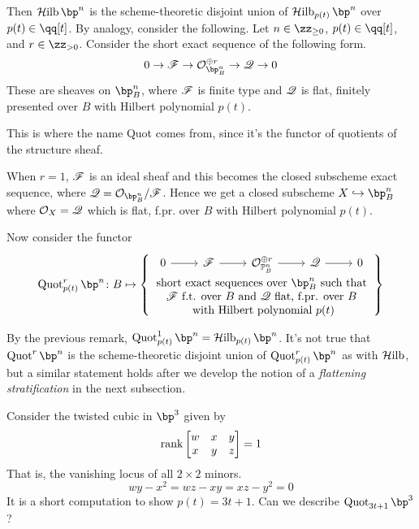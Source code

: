 \documentclass[12pt]{article}
\begin{document}
Then $\Hilb \bp^n$ is the scheme-theoretic disjoint union of $\Hilb_{p(t)} \bp^n$ over $p(t) \in \qq[t]$. By analogy, consider the following. Let $n \in \zz_{\geq 0}$, $p(t) \in \qq[t]$, and $r \in \zz_{> 0}$. Consider the short exact sequence of the following form.
\[0 \to \fanf \to \calo^{\oplus r}_{\bp^n_B} \to \fanq \to 0\]
These are sheaves on $\bp^n_B$, where $\mathscr{F}$ is finite type and $\mathscr{Q}$ is flat, finitely presented over $B$ with Hilbert polynomial $p(t)$.

\begin{note}
  This is where the name Quot comes from, since it's the functor of quotients of the structure sheaf.
\end{note}

\begin{rem}
  When $r = 1$, $\mathscr{F}$ is an ideal sheaf and this becomes the closed subscheme exact sequence, where $\fanq = \calo_{\bp^n_B}/\fanf$. Hence we get a closed subscheme $X \hookrightarrow \bp^n_B$ where $\mathcal{O}_X = \mathscr{Q}$ which is flat, f.pr. over $B$ with Hilbert polynomial $p(t)$.
\end{rem}

Now consider the functor
\[\Quot^{r}_{p(t)} \bp^n \colon B \mapsto \left\{ \begin{array}{c}
\begin{tikzcd}
0 \arrow[r] & \fanf \arrow[r] & \mathcal{O}^{\oplus r}_{\mathbb{P}^n_B} \arrow[r] & \fanq \arrow[r] & 0
\end{tikzcd} \\
\text{short exact sequences over } \bp^n_B \text{ such that} \\
\fanf\text{ f.t. over } B \text{ and } \fanq \text{ flat, f.pr. over }B \\
\text{ with Hilbert polynomial }p(t)
\end{array}\right\}\]

By the previous remark, $\Quot^1_{p(t)} \bp^n = \Hilb_{p(t)} \bp^n$. It's not true that $\Quot^r \bp^n$ is the scheme-theoretic disjoint union of $\Quot^r_{p(t)} \bp^n$ as with $\operatorname{\mathcal{H} ilb}$, but a similar statement holds after we develop the notion of a \textit{flattening stratification} in the next subsection.

\begin{example}
  Consider the twisted cubic in $\bp^3$ given by
  \[\operatorname{rank} \begin{bmatrix}
      w & x & y \\
      x & y & z
  \end{bmatrix} = 1\]
  That is, the vanishing locus of all $2 \times 2$ minors. 
  \[wy - x^2 = wz - xy = xz - y^2 = 0\]
  It is a short computation to show $p(t) = 3t + 1$. Can we describe $\Quot_{3t+1} \bp^3$?
\end{example}
\end{document}
